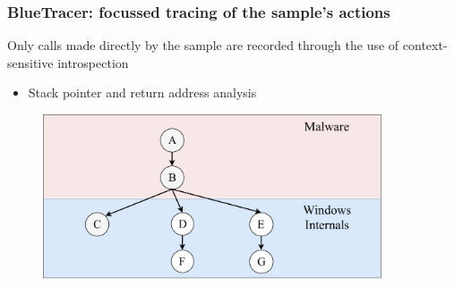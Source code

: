 \documentclass[compress]{beamer}
\begin{document}
\begin{frame}
    \frametitle{BlueTracer: focussed tracing of the sample's actions}

Only calls made directly by the sample are recorded through the use of context-sensitive introspection
\begin{itemize}
\item Stack pointer and return address analysis
\end{itemize}    
\medskip
	    \begin{figure}
    	\vspace{-0.3cm}
        \includegraphics[width=10cm]{image/MainImageTree.pdf}
    \end{figure}

\end{frame}
\end{document}
